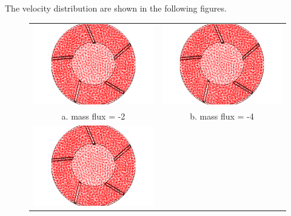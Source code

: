 \documentclass[letterpaper,12pt]{article}
\begin{document}
The velocity distribution are shown in the following figures.
\\
\begin{figure}[!h!tbp]
\begin{center}
\begin{tabular}{ c c }
\includegraphics[scale=0.263157894737]{./Figures/Image_7.png}
 & \includegraphics[scale=0.263157894737]{./Figures/Image_8.png}
 \\ a. mass flux = -2 & b. mass flux = -4 \\
\includegraphics[scale=0.263157894737]{./Figures/Image_9.png}

\end{tabular}
\end{center}
\end{figure}
\end{document}
